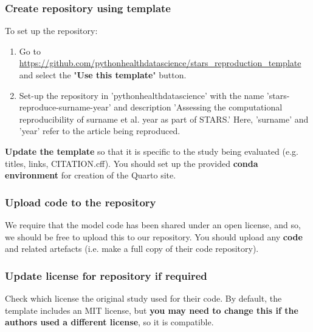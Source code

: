 \vspace{0.5cm}
\subsubsection{Create repository using template}

To set up the repository:

\begin{enumerate}
    \item Go to \url{https://github.com/pythonhealthdatascience/stars_reproduction_template} and select the "\textbf{Use this template}" button.
    \item Set-up the repository in 'pythonhealthdatascience' with the name 'stars-reproduce-surname-year' and description 'Assessing the computational reproducibility of surname et al. year as part of STARS.' Here, 'surname' and 'year' refer to the article being reproduced.
\end{enumerate}

\textbf{Update the template} so that it is specific to the study being evaluated (e.g. titles, links, CITATION.cff). You should set up the provided \textbf{conda environment} for creation of the Quarto site.

\vspace{0.5cm}
\subsubsection{Upload code to the repository}

We require that the model code has been shared under an open license, and so, we should be free to upload this to our repository. You should upload any \textbf{code} and related artefacts (i.e. make a full copy of their code repository).

\vspace{0.5cm}
\subsubsection{Update license for repository if required}

Check which license the original study used for their code. By default, the template includes an MIT license, but \textbf{you may need to change this if the authors used a different license}, so it is compatible.

